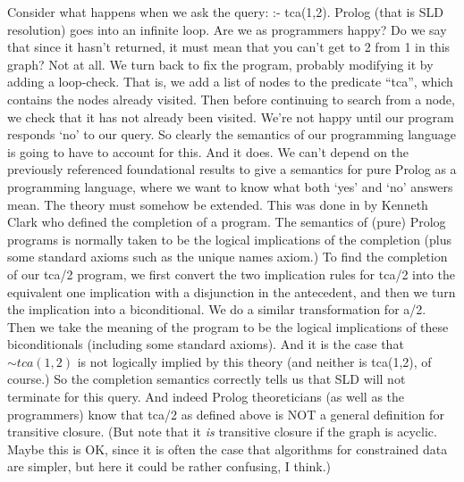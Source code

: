 Consider what happens when we ask the query: :- tca(1,2).  Prolog (that
is SLD resolution) goes into an infinite loop.  Are we as programmers
happy?  Do we say that since it hasn't returned, it must mean that you
can't get to 2 from 1 in this graph?  Not at all.  We turn back to fix
the program, probably modifying it by adding a loop-check.  That is,
we add a list of nodes to the predicate ``tca'', which contains the
nodes already visited.  Then before continuing to search from a node,
we check that it has not already been visited.  We're not happy until
our program responds `no' to our query.  So clearly the semantics of
our programming language is going to have to account for this.  And it
does.  We can't depend on the previously referenced foundational
results to give a semantics for pure Prolog as a programming language,
where we want to know what both `yes' and `no' answers mean.  The
theory must somehow be extended.  This was done in \cite{} by Kenneth Clark who defined
the completion of a program.  The semantics of (pure) Prolog programs
is normally taken to be the logical implications of the completion
(plus some standard axioms such as the unique names axiom.)  To find
the completion of our tca/2 program, we first convert the two
implication rules for tca/2 into the equivalent one implication with a
disjunction in the antecedent, and then we turn the implication into a
biconditional.  We do a similar transformation for a/2.  Then we take
the meaning of the program to be the logical implications of these
biconditionals (including some standard axioms).  And it is the case
that $\sim tca(1,2)$ is not logically implied by this theory (and
neither is tca(1,2), of course.)  So the completion semantics correctly
tells us that SLD will not terminate for this query.  And indeed
Prolog theoreticians (as well as the programmers) know that tca/2 as
defined above is NOT a general definition for transitive closure.
(But note that it {\em is} transitive closure if the graph is acyclic.
Maybe this is OK, since it is often the case that algorithms for
constrained data are simpler, but here it could be rather confusing, I
think.)

